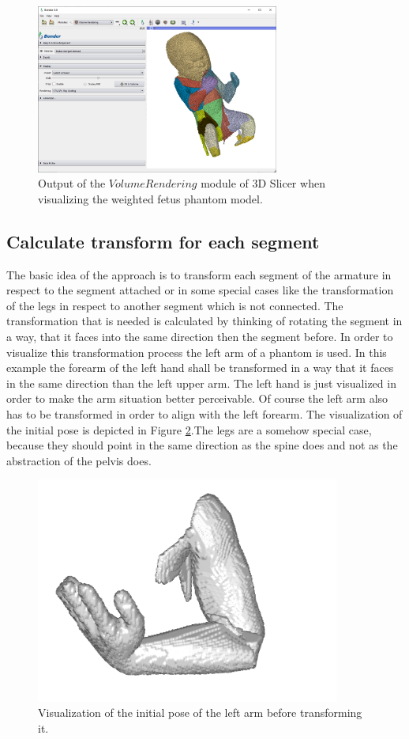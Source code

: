 \begin{figure} [!htb]
    \centering
	\includegraphics[width=8cm]{content/images/volumeRendering}
	\caption{Output of the $VolumeRendering$ module of 3D Slicer when visualizing the weighted fetus phantom model.} 
	\label{fig:volumeRendering}
\end{figure}


\newpage
\subsection{Calculate transform for each segment}

The basic idea of the approach is to transform each segment of the armature in respect to the segment attached or in some special cases like the transformation of the legs in respect to another segment which is not connected. The transformation that is needed is calculated by thinking of rotating the segment in a way, that it faces into the same direction then the segment before. In order to visualize this transformation process the left arm of a phantom is used. In this example the forearm of the left hand shall be transformed in a way that it faces in the same direction than the left upper arm. The left hand is just visualized in order to make the arm situation better perceivable. Of course the left arm also has to be transformed in order to align with the left forearm. The visualization of the initial pose is depicted in Figure \ref{fig:leftArm}.The legs are a somehow special case, because they should point in the same direction as the spine does and not as the abstraction of the pelvis does.

\begin{figure} [!htb]
    \centering
	\includegraphics[width=10cm]{content/images/leftArm}
	\caption{Visualization of the initial pose of the left arm before transforming it.} 
	\label{fig:leftArm}
\end{figure}

